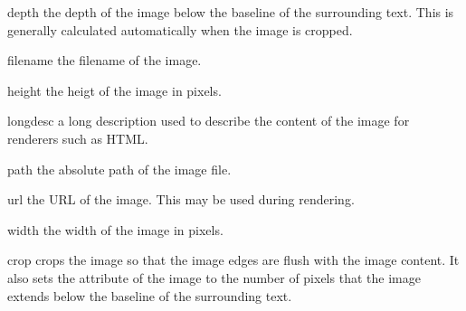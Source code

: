 \begin{memberdesc}[Image]{depth}
the depth of the image below the baseline of the
surrounding text.  This is generally calculated automatically when
the image is cropped.
\end{memberdesc}

\begin{memberdesc}[Image]{filename}
the filename of the image.
\end{memberdesc}

\begin{memberdesc}[Image]{height}
the heigt of the image in pixels.
\end{memberdesc}

\begin{memberdesc}[Image]{longdesc}
a long description used to describe the content of
the image for renderers such as HTML.
\end{memberdesc}

\begin{memberdesc}[Image]{path}
the absolute path of the image file.
\end{memberdesc}

\begin{memberdesc}[Image]{url}
the URL of the image.  This may be used during rendering.
\end{memberdesc}

\begin{memberdesc}[Image]{width}
the width of the image in pixels.
\end{memberdesc}


\begin{methoddesc}[Image]{crop}{}
crops the image so that the image edges are flush with the image
content.  It also sets the  attribute of the image
to the number of pixels that the image extends below the baseline
of the surrounding text.
\end{methoddesc}

